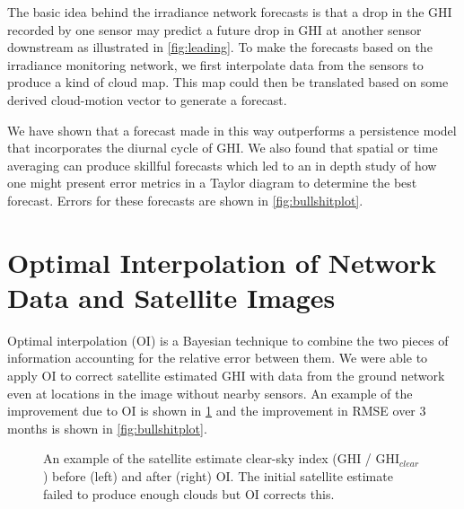 \documentclass[12pt,letterpaper,notitlepage,openany]{article}
\begin{document}
The basic idea behind the irradiance network forecasts is that a drop
in the GHI recorded by one sensor may predict a future drop in GHI at
another sensor downstream as illustrated in \cref{fig:leading}.
To make the forecasts based on the irradiance monitoring network, we
first interpolate data from the sensors to produce a kind of cloud
map.
This map could then be translated based on some derived cloud-motion
vector to generate a forecast.

We have shown that a forecast made in this way outperforms a
persistence model that incorporates the diurnal cycle of GHI.
We also found that spatial or time averaging can produce skillful
forecasts which led to an in depth study of how one might present
error metrics in a Taylor diagram to determine the best forecast.
Errors for these forecasts are shown in \cref{fig:bullshitplot}.

\section{Optimal Interpolation of Network Data and Satellite Images}
Optimal interpolation (OI) is a Bayesian technique to combine the two
pieces of information accounting for the relative error between them.
We were able to apply OI to correct satellite estimated GHI with data
from the ground network even at locations in the image without nearby
sensors.
An example of the improvement due to OI is shown in \cref{fig:satoi}
and the improvement in RMSE over 3 months is shown in \cref{fig:bullshitplot}.

\begin{figure}[h]
\centering
{}
\caption{An example of the satellite estimate clear-sky index (GHI /
  GHI$_{clear}$) before (left) and after (right) OI. The initial
  satellite estimate failed to produce enough clouds but OI corrects
  this.}
\label{fig:satoi}
\end{figure}
\end{document}
